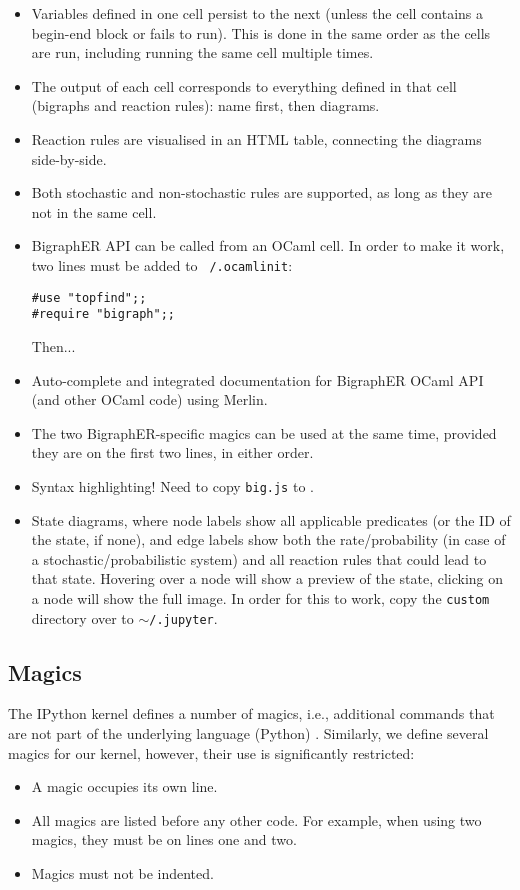 \documentclass{article}
\begin{document}
\begin{itemize}
\item Variables defined in one cell persist to the next (unless the cell
  contains a begin-end block or fails to run). This is done in the same order as
  the cells are run, including running the same cell multiple times.
\item The output of each cell corresponds to everything defined in that cell
  (bigraphs and reaction rules): name first, then diagrams.
\item Reaction rules are visualised in an HTML table, connecting the diagrams
  side-by-side.
\item Both stochastic and non-stochastic rules are supported, as long as they
  are not in the same cell.
\item BigraphER API can be called from an OCaml cell. In order to make it work,
  two lines must be added to \texttt{~/.ocamlinit}:
  \begin{lstlisting}
#use "topfind";;
#require "bigraph";;
  \end{lstlisting}
  Then... %
\item Auto-complete and integrated documentation for BigraphER OCaml API (and
  other OCaml code) using Merlin.
\item The two BigraphER-specific magics can be used at the same time, provided
  they are on the first two lines, in either order.
\item Syntax highlighting! Need to copy \texttt{big.js} to
  .
\item State diagrams, where node labels show all applicable predicates (or the
  ID of the state, if none), and edge labels show both the rate/probability
  (in case of a stochastic/probabilistic system) and all reaction rules that
  could lead to that state. Hovering over a node will show a preview of the
  state, clicking on a node will show the full image. In order for this to
  work, copy the \texttt{custom} directory over to
  \texttt{$\sim$/.jupyter}.
\end{itemize}

\subsection{Magics}

The IPython kernel defines a number of magics, i.e., additional commands that
are not part of the underlying language (Python) \cite{website:magic}.
Similarly, we define several magics for our kernel, however, their use is
significantly restricted:
\begin{itemize}
\item A magic occupies its own line.
\item All magics are listed before any other code. For example, when using two
  magics, they must be on lines one and two.
\item Magics must not be indented.
\end{itemize}
\end{document}
